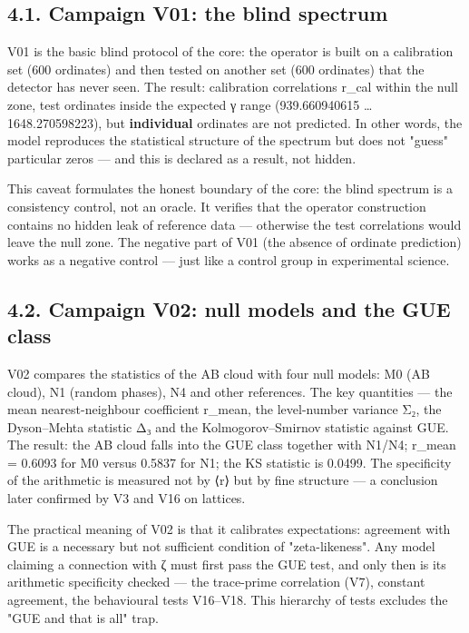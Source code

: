 \documentclass[11pt,a4paper]{article}
\begin{document}
\subsection{4.1. Campaign V01: the blind spectrum}

V01 is the basic blind protocol of the core: the operator is built on a calibration set (600 ordinates) and then tested on another set (600 ordinates) that the detector has never seen. The result: calibration correlations r\_cal within the null zone, test ordinates inside the expected γ range (939.660940615 … 1648.270598223), but \textbf{individual} ordinates are not predicted. In other words, the model reproduces the statistical structure of the spectrum but does not "guess" particular zeros — and this is declared as a result, not hidden.

This caveat formulates the honest boundary of the core: the blind spectrum is a consistency control, not an oracle. It verifies that the operator construction contains no hidden leak of reference data — otherwise the test correlations would leave the null zone. The negative part of V01 (the absence of ordinate prediction) works as a negative control — just like a control group in experimental science.

\subsection{4.2. Campaign V02: null models and the GUE class}

V02 compares the statistics of the AB cloud with four null models: M0 (AB cloud), N1 (random phases), N4 and other references. The key quantities — the mean nearest-neighbour coefficient r\_mean, the level-number variance Σ₂, the Dyson–Mehta statistic Δ₃ and the Kolmogorov–Smirnov statistic against GUE. The result: the AB cloud falls into the GUE class together with N1/N4; r\_mean = 0.6093 for M0 versus 0.5837 for N1; the KS statistic is 0.0499. The specificity of the arithmetic is measured not by ⟨r⟩ but by fine structure — a conclusion later confirmed by V3 and V16 on lattices.

The practical meaning of V02 is that it calibrates expectations: agreement with GUE is a necessary but not sufficient condition of "zeta-likeness". Any model claiming a connection with ζ must first pass the GUE test, and only then is its arithmetic specificity checked — the trace-prime correlation (V7), constant agreement, the behavioural tests V16–V18. This hierarchy of tests excludes the "GUE and that is all" trap.
\end{document}
